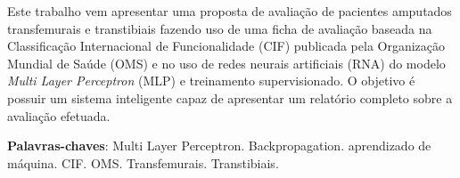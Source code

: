 \begin{resumo}

 Este trabalho vem apresentar uma proposta de avaliação de pacientes amputados transfemurais e transtibiais fazendo uso de uma ficha de avaliação baseada na Classificação Internacional de Funcionalidade (CIF) publicada pela Organização Mundial de Saúde (OMS) e no uso de redes neurais artificiais (RNA) do modelo \textit{Multi Layer Perceptron} (MLP) e treinamento supervisionado. O objetivo é possuir um sistema inteligente capaz de apresentar um relatório completo sobre a avaliação efetuada.

 \vspace{\onelineskip}

 \noindent
 \textbf{Palavras-chaves}: Multi Layer Perceptron. Backpropagation. aprendizado de máquina. CIF. OMS. Transfemurais. Transtibiais.
\end{resumo}
